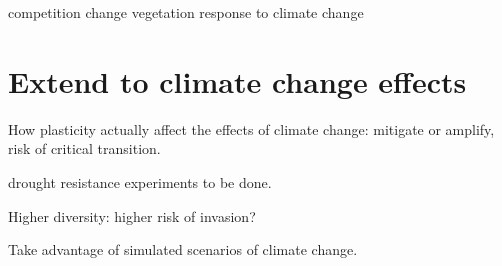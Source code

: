 competition change vegetation response to climate change \parencite{van_loon_how_2014}

\section{Extend to climate change effects}

How plasticity actually affect the effects of climate change: mitigate or amplify, risk of critical transition.

drought resistance experiments to be done.

Higher diversity: higher risk of invasion?

Take advantage of simulated scenarios of climate change.